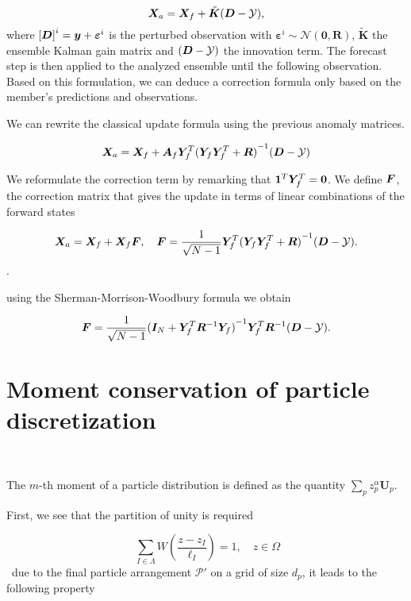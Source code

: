 \begin{equation} \label{enkf_formula}
    \bm{X}_a = \bm{X}_f + \tilde{\bm{K}} ( \bm{D} - \mathcal{Y}),
\end{equation}where ${[\bm{D}]}^i = \bm{y} + \bm{\varepsilon}^i$ is the perturbed observation with $\bm{\varepsilon}^i \sim \mathcal{N}(\bm{0}, \bm R) $, $\tilde{\bm{K}}$ the ensemble Kalman gain matrix and $( \bm{D} - \mathcal{Y})$ the innovation term.
The forecast step is then applied to the analyzed ensemble until the following observation.
Based on this formulation, we can deduce a correction formula only based on the member's predictions and observations.

We can rewrite the classical update formula using the previous anomaly matrices.

\begin{equation*}
    \bm{X}_a = \bm{X}_f + \bm A_f \bm Y_f^T {({\bm Y_f \bm Y_f^T + \bm R})}^{-1}(\bm{D} - \mathcal{Y})
\end{equation*}

We reformulate the correction term by remarking that $ \bm{1}^T  \bm Y_f^T = \bm{0}$. We define $\bm{F}$, the correction matrix that gives the update in terms of linear combinations of the forward states

\begin{equation*}
    \bm{X}_a = \bm{X}_f + \bm{X}_f \bm{F}, \quad \bm{F} = \frac{1}{\sqrt{N - 1}}\bm Y_f^T {(\bm Y_f \bm Y_f^T + \bm R)}^{-1}(\bm{D} - \mathcal{Y}).
\end{equation*}.

using the Sherman-Morrison-Woodbury formula we obtain

\begin{equation*}
    \bm{F} = \frac{1}{\sqrt{N - 1}} {(\bm I_N + \bm Y_f^T\bm R^{-1}\bm Y_f)}^{-1}\bm Y_f^T \bm R^{-1} (\bm{D} - \mathcal{Y}).
\end{equation*}
\section{Moment conservation of particle discretization}~\label{appendix:moment_conservation}

The $m$-th moment of a particle distribution is defined as the quantity $\sum_{p} z_p^{\alpha} \bm{U}_p$.

First, we see that the partition of unity is required

\begin{equation}~\label{eq:unity1}
    \sum_{I \in \Lambda} W\left(\frac{z - z_I}{\ell_I}\right) = 1 ,\quad z \in \Omega
\end{equation}~due to the final particle arrangement $\mathcal{P'}$ on a grid of size $d_p$, it leads to the following property

